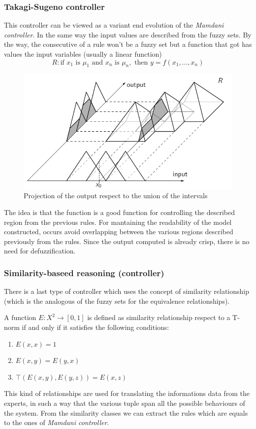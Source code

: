 \documentclass{article}
\begin{document}
\subsubsection{Takagi-Sugeno controller}
This controller can be viewed as a variant end evolution of the \textit{Mamdani controller}.
In the same way the input values are described from the fuzzy sets. By the way, the
consecutive of a rule won't be a fuzzy set but a function that got has values the
input variables (usually a linear function)
$$R:\text{if } x_1 \text{ is } \mu_1 \text{ and } x_n \text{ is }\mu_n,\text{ then }y=f(x_1,\dots,x_n)$$
\begin{figure}[H]
    \centering
    \includegraphics[scale=0.5]{images/takegi-sugeno.png}
    \caption{Projection of the output respect to the union of the intervals}
\end{figure}
The idea is that the function is a good function for controlling the described region from the
previous rules. For mantaining the readability of the model constructed, occurs avoid
overlapping between the various regions described previously from the rules. Since the output
computed is already crisp, there is no need for defuzzification.

\subsubsection{Similarity-baseed reasoning (controller)}
There is a last type of controller which uses the concept of similarity relationship (which
is the analogous of the fuzzy sets for the equivalence relationships).

A function $E:X^2\rightarrow[0,1]$ is defined as similarity relationship respect to a T-norm
if and only if it satisfies the following conditions:
\begin{enumerate}
    \item $E(x,x)=1$
    \item $E(x,y)=E(y,x)$
    \item $\top (E(x,y),E(y,z))=E(x,z)$
\end{enumerate}
This kind of relationships are used for translating the informations data from the experts, in
such a way that the various tuple span all the possible behaviours of the system. From the
similarity classes we can extract the rules which are equals to the ones of \textit{Mamdani controller}.
\end{document}
